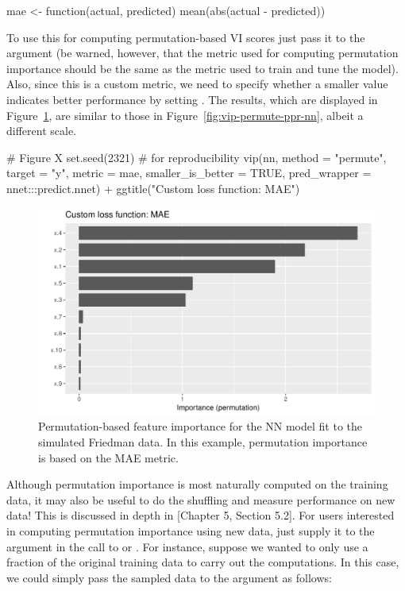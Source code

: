 \begin{example}
mae <- function(actual, predicted) {
  mean(abs(actual - predicted))
}
\end{example}

To use this for computing permutation-based VI scores just pass it to the  argument (be warned, however, that the metric used for computing permutation importance should be the same as the metric used to train and tune the model). Also, since this is a custom metric, we need to specify whether a smaller value indicates better performance by setting . The results, which are displayed in Figure~\ref{fig:vip-nn-mae}, are similar to those in Figure~\ref{fig:vip-permute-ppr-nn}, albeit a different scale.

\begin{example}
# Figure X
set.seed(2321)  # for reproducibility
vip(nn, method = "permute", target = "y", metric = mae,
    smaller_is_better = TRUE, pred_wrapper = nnet:::predict.nnet) +
  ggtitle("Custom loss function: MAE")
\end{example}

\begin{figure}[!htb]
  \centering
  \includegraphics[width=1\linewidth]{figures/vip-permute-nn-mae}
  \caption{Permutation-based feature importance for the NN model fit to the simulated Friedman data. In this example, permutation importance is based on the MAE metric.}
  \label{fig:vip-nn-mae}
\end{figure}

Although permutation importance is most naturally computed on the training data, it may also be useful to do the shuffling and measure performance on new data! This is discussed in depth in \citet{molnar-2019-iml}[Chapter 5, Section 5.2]. For users interested in computing permutation importance using new data, just supply it to the  argument in the call to  or . For instance, suppose we wanted to only use a fraction of the original training data to carry out the computations. In this case, we could simply pass the sampled data to the  argument as follows:

